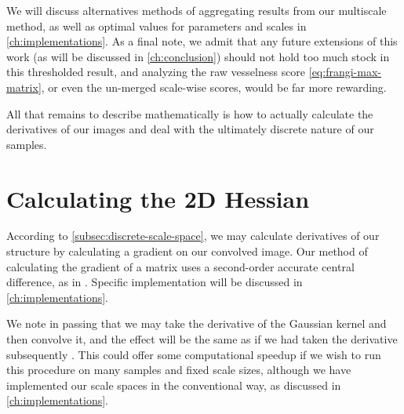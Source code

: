 	We will discuss alternatives methods of aggregating results from our multiscale method, as well as optimal values for parameters and scales
	in \cref{ch:implementations}. As a final note, we admit that any future extensions of this work (as will be discussed in \cref{ch:conclusion}) should not hold too much stock in this thresholded result, and analyzing the 
	raw vesselness score \cref{eq:frangi-max-matrix}, or even
	the un-merged scale-wise scores, would be far more
	rewarding.    
	

All that remains to describe mathematically is how to actually calculate the derivatives of our images and deal with the ultimately discrete nature of our samples.    
 
 
\section{Calculating the 2D Hessian}

According to \cref{subsec:discrete-scale-space}, we may calculate derivatives of our structure by calculating a gradient on our convolved image. Our method of calculating the gradient of a matrix uses a second-order accurate central difference, as in \cite{fornberg-1988}. Specific implementation will be discussed in \cref{ch:implementations}.

We note in passing that we may take the derivative of the Gaussian kernel and then convolve it, and the effect will be the same as if we had taken the derivative subsequently \cite{DIPGW}. This could offer some computational speedup if we wish to run this procedure on many samples and fixed scale sizes, although we have implemented our scale spaces in the conventional way, as discussed in \cref{ch:implementations}.


